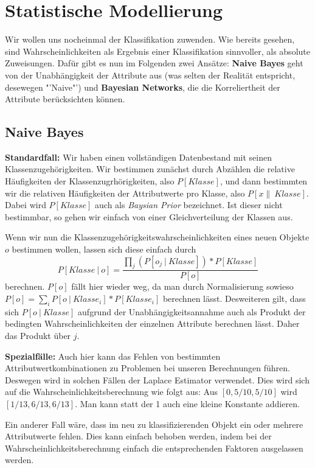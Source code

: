 \section{Statistische Modellierung}
Wir wollen uns nocheinmal der Klassifikation zuwenden. Wie bereits
gesehen, sind Wahrscheinlichkeiten als Ergebnis einer Klassifikation
sinnvoller, als absolute Zuweisungen. Dafür gibt es nun im Folgenden
zwei Ansätze: \textbf{Naive Bayes} geht von der Unabhängigkeit
der Attribute aus (was selten der Realität entspricht, desewegen "'Naive"')
und \textbf{Bayesian Networks}, die die Korreliertheit der Attribute
berücksichten können.

\subsection{Naive Bayes}
\textbf{Standardfall:} Wir haben einen vollständigen Datenbestand 
mit seinen Klassenzugehörigkeiten. Wir bestimmen zunächst durch
Abzählen die relative Häufigkeiten der Klassenzugrhörigkeiten, also
\(P[Klasse]\), und dann bestimmten wir die relativen Häufigkeiten
der Attributwerte pro Klasse, also \(P[x\|\ Klasse]\). Dabei wird
\(P[Klasse]\) auch als \textit{Baysian Prior} bezeichnet. Ist dieser
nicht bestimmbar, so gehen wir einfach von einer Gleichverteilung der
Klassen aus.

Wenn wir nun die Klassenzugehörigkeitswahrscheinlichkeiten
eines neuen Objekte \(o\)
bestimmen wollen, lassen sich diese einfach durch
\[ P[Klasse\ |\ o] = \frac{\prod_j (P[o_j\ |\ Klasse])*P[Klasse]}{P[o]}\]
berechnen. \(P[o]\) fällt hier wieder weg, da man durch Normalisierung
sowieso \(P[o] = \sum_i P[o\ |\ Klasse_i]*P[Klasse_i]\) berechnen
lässt. Desweiteren gilt, dass sich \(P[o\ |\ Klasse]\) aufgrund
der Unabhängigkeitsannahme auch als Produkt der bedingten
Wahrscheinlichkeiten der einzelnen Attribute berechnen lässt. Daher das
Produkt über \(j\).

\textbf{Spezialfälle:} Auch hier kann das Fehlen von bestimmten
Attributwertkombinationen zu Problemen bei unseren Berechnungen führen.
Deswegen wird in solchen Fällen der Laplace Estimator verwendet. Dies
wird sich auf die Wahrscheinlichkeitsberechnung wie folgt aus:
Aus \([0, 5/10, 5/10]\) wird \([1/13, 6/13, 6/13]\). Man kann statt der
1 auch eine kleine Konstante addieren.

Ein anderer Fall wäre, dass im neu zu klassifizierenden Objekt
ein oder mehrere Attributwerte fehlen. Dies kann einfach behoben werden,
indem bei der Wahrscheinlichkeitsberechnung einfach die entsprechenden 
Faktoren ausgelassen werden.

